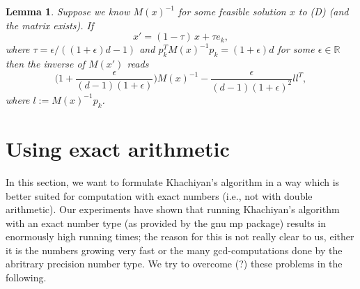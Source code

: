 \documentclass[a4paper,twocolumn]{article}
\newcommand{\R}{\ensuremath{\mathbb{R}}}
\newtheorem{lemma}[theorem]{Lemma}
\begin{document}
\begin{lemma}
  \label{lm:rank-1}
  Suppose we know $M(x)^{-1}$ for some feasible solution $x$ to (D)
  (and the matrix exists).  If
  \[
  x' = (1-\tau)\, x + \tau e_k,
  \]
  where $\tau = \epsilon/((1+\epsilon)d - 1)$ and $p_k^T M(x)^{-1} p_k
  = (1+\epsilon)d$ for some $\epsilon\in\R$ then the inverse of
  $M(x')$ reads
  \[
    \Big(
      1+\frac{\epsilon}{(d-1)(1+\epsilon)}
    \Big) M(x)^{-1} 
    -
    \frac{\epsilon}{(d-1)(1+\epsilon)^2} l l^T,
  \]
  where $l:= M(x)^{-1} p_k$.
\end{lemma}

\section{Using exact arithmetic}

In this section, we want to formulate Khachiyan's algorithm in a way
which is better suited for computation with exact numbers (i.e., not
with double arithmetic).  Our experiments have shown that running
Khachiyan's algorithm with an exact number type (as provided by the
{\sc gnu mp} package) results in enormously high running times; the
reason for this is not really clear to us, either it is the numbers
growing very fast or the many gcd-computations done by the abritrary
precision number type.  We try to overcome (?) these problems in the
following.
\end{document}
